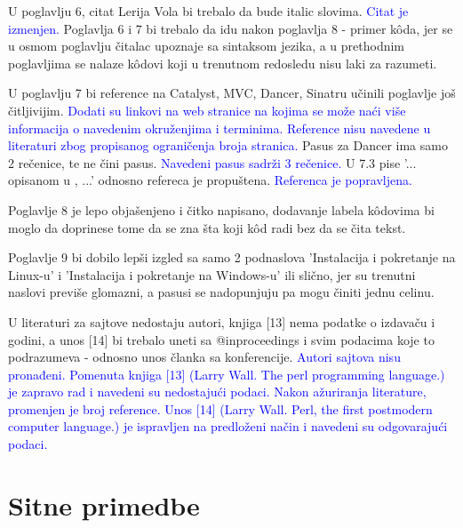 \documentclass[a4paper]{report}
\newcommand{\odgovor}[1]{\textcolor{blue}{#1}}
\begin{document}
U poglavlju 6, citat Lerija Vola bi trebalo da bude italic slovima.
\odgovor{Citat je izmenjen.} Poglavlja 6 i 7 bi trebalo da idu nakon poglavlja 8 - primer k\^{o}da, jer se u osmom poglavlju čitalac upoznaje sa sintaksom jezika, a u prethodnim poglavljima se nalaze k\^{o}dovi koji u trenutnom redosledu nisu laki za razumeti.

U poglavlju 7 bi reference na Catalyst, MVC, Dancer, Sinatru učinili poglavlje još čitljivijim.
\odgovor{Dodati su linkovi na web stranice na kojima se može naći više informacija o navedenim okruženjima i terminima. Reference nisu navedene u literaturi zbog propisanog ograničenja broja stranica.} 
Pasus za Dancer ima samo 2 rečenice, te ne čini pasus. 
\odgovor{Navedeni pasus sadrži 3 rečenice.} 
U 7.3 pise '... opisanom u , ...' odnosno refereca je propuštena. \odgovor{Referenca je popravljena.}

Poglavlje 8 je lepo objašenjeno i čitko napisano, dodavanje labela k\^{o}dovima bi moglo da doprinese tome da se zna šta koji k\^{o}d radi bez da se čita tekst.

Poglavlje 9 bi dobilo lepši izgled sa samo 2 podnaslova 'Instalacija i pokretanje na Linux-u' i 'Instalacija i pokretanje na Windows-u' ili slično, jer su trenutni naslovi previše glomazni, a pasusi se nadopunjuju pa mogu činiti jednu celinu.

U literaturi za sajtove nedostaju autori, knjiga [13] nema podatke o izdavaču i godini, a unos [14] bi trebalo uneti sa @inproceedings i svim podacima koje to podrazumeva - odnosno unos članka sa konferencije.
\odgovor{Autori sajtova nisu pronađeni. Pomenuta knjiga [13] (Larry Wall. The perl programming language.) je zapravo rad i navedeni su nedostajući podaci. Nakon ažuriranja literature, promenjen je broj reference. Unos [14] (Larry Wall. Perl, the first postmodern computer language.) je ispravljen na predloženi način i navedeni su odgovarajući podaci. }

\section{Sitne primedbe}
\end{document}
